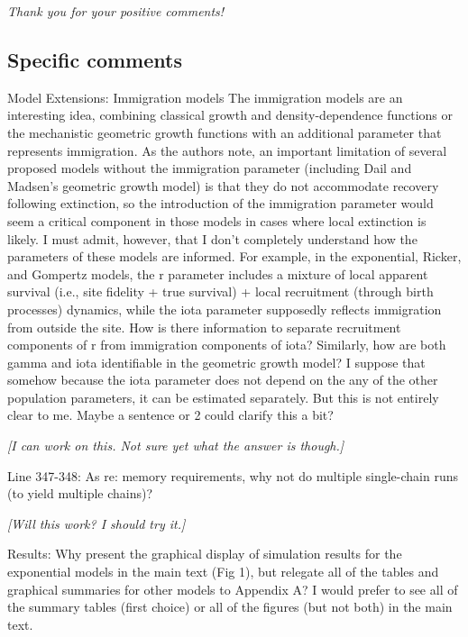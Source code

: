 \documentclass[12pt,english]{article}
\begin{document}
\begin{spacing}{1.9}
\begin{flushleft}
\vspace{0.5cm}
\textit{Thank you for your positive comments!}
\vspace{0.5cm}

\subsection*{Specific comments} 
Model Extensions: Immigration models 
The immigration models are an interesting idea, combining classical growth and
density-dependence functions or the mechanistic geometric growth functions with
an additional parameter that represents immigration. As the authors note, an
important limitation of several proposed models without the immigration
parameter (including Dail and Madsen's geometric growth model) is that they do
not accommodate recovery following extinction, so the introduction of the
immigration parameter would seem a critical component in those models in cases
where local extinction is likely. I must admit, however, that I don't completely
understand how the parameters of these models are informed. For example, in the
exponential, Ricker, and Gompertz models, the r parameter includes a mixture of
local apparent survival (i.e., site fidelity + true survival) + local
recruitment (through birth processes) dynamics, while the iota parameter
supposedly reflects immigration from outside the site. How is there
information to separate recruitment components of r from immigration components
of iota? Similarly, how are both gamma and iota identifiable in the geometric
growth model? I suppose that somehow because the iota parameter does not depend
on the any of the other population parameters, it can be estimated separately.
But this is not entirely clear to me. Maybe a sentence or 2 could clarify this a
bit?

\vspace{0.5cm}
\textit{[I can work on this.  Not sure yet what the answer is though.]}
\vspace{0.5cm}

Line 347-348: As re: memory requirements, why not do multiple single-chain runs
(to yield multiple chains)?

\vspace{0.5cm}
\textit{[Will this work?  I should try it.]}
\vspace{0.5cm}

Results: Why present the graphical display of simulation results for the
exponential models in the main text (Fig 1), but relegate all of the tables and
graphical summaries for other models to Appendix A? I would prefer to see all of
the summary tables (first choice) or all of the figures (but not both) in the
main text.


\end{flushleft}
\end{spacing}
\end{document}
